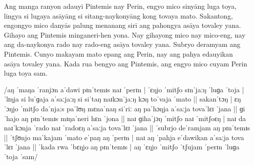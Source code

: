 \documentclass[12pt,paper=a4]{scrartcl}
\begin{document}
\noindent Ang manga ranyon adauyi Pintemis nay Perin, engyo mico sinyāng luga toya, lingya si lugaya asāyāng si sitang-naykonyāng kong tovaya mato.
Sakantong, engongyo mico danyās palung menanang sirī ang pahongya asāya tovaley yana.
Gihayo ang Pintemis minganeri-hen yona.
Nay gihayong mico nay mico-eng, nay ang da-naykonya rado nay rado-eng asāya tovaley yana.
Subryo deramyam ang Pintemis.
Cunyo makayam mato epang ang Perin, nay ang pahya edauyikan asāya tovaley yana.
Kada rua bengyo ang Pintemis, ang engyo mico cuyam Perin luga toya sam.\\

\begin{sloppypar}
\noindent /aŋ ˈmaŋa ˈranjɔn aˈdawi pɪnˈtemɪs naɪ ˈperɪn | ˈɛŋjo ˈmitʃo sɪnˈjaːŋ ˈluɡa ˈtoja | ˈlɪŋja si luˈɡaja aˈsaːjaːŋ si siˈtaŋ naɪkɔnˈjaːŋ kɔŋ toˈvaja ˈmato ||
sakanˈtɔŋ | ɛŋˈɔŋjo ˈmitʃo daˈnjaːs paˈlʊŋ mɛnaˈnaŋ siˈriː aŋ paˈhɔŋja aˈsaːja tovaˈlɛɪ ˈjana ||
ɡiˈhajo aŋ pɪnˈtemɪs mɪŋaˈneri hɛn ˈjona ||
naɪ ɡihaˈjɔŋ ˈmitʃo naɪ ˈmitʃoɛŋ | naɪ da naɪˈkɔnja ˈrado naɪ ˈradoɛŋ aˈsaːja tovaˈlɛɪ ˈjana ||
ˈsubrjo deˈramjam aŋ pɪnˈtemɪs ||
ˈtʃʊnjo maˈkajam ˈmato eˈpaŋ aŋ ˈperɪn | naɪ aŋ ˈpahja eˈdawikan aˈsaːja tovaˈlɛɪ ˈjana ||
ˈkada rwa ˈbɛŋjo aŋ pɪnˈtemɪs | aŋ ˈɛŋjo ˈmitʃo ˈtʃujam ˈperɪn ˈluɡa ˈtoja ˈsam/
\end{sloppypar}



\begin{multicols}{3}
\printglossary[style=mysuper,type=\leipzigtype]
\end{multicols}

\printbibliography[heading=bibintoc]
\end{document}
